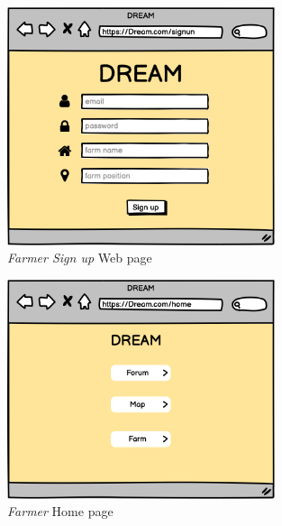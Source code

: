 \begin{figure}[H]
    \begin{center}
    \includegraphics[width=0.7\textwidth]{mocups/SignUp.png}
    \caption{\emph{Farmer Sign up} Web page}
    \label{fig:sequence1}
    \end{center}
\end{figure}

\begin{figure}[H]
    \begin{center}
    \includegraphics[width=0.7\textwidth]{mocups/FHome.png}
    \caption{\emph{Farmer} Home page}
    \label{fig:sequence1}
    \end{center}
\end{figure}

